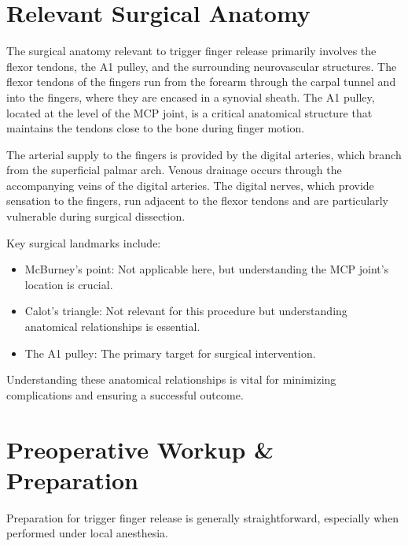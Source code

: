\section*{Relevant Surgical Anatomy}
The surgical anatomy relevant to trigger finger release primarily involves the flexor tendons, the A1 pulley, and the surrounding neurovascular structures. The flexor tendons of the fingers run from the forearm through the carpal tunnel and into the fingers, where they are encased in a synovial sheath. The A1 pulley, located at the level of the MCP joint, is a critical anatomical structure that maintains the tendons close to the bone during finger motion. 

The arterial supply to the fingers is provided by the digital arteries, which branch from the superficial palmar arch. Venous drainage occurs through the accompanying veins of the digital arteries. The digital nerves, which provide sensation to the fingers, run adjacent to the flexor tendons and are particularly vulnerable during surgical dissection. 

Key surgical landmarks include:
\begin{itemize}
  \item McBurney's point: Not applicable here, but understanding the MCP joint's location is crucial.
  \item Calot's triangle: Not relevant for this procedure but understanding anatomical relationships is essential.
  \item The A1 pulley: The primary target for surgical intervention.
\end{itemize}

Understanding these anatomical relationships is vital for minimizing complications and ensuring a successful outcome.

\section*{Preoperative Workup \& Preparation}
Preparation for trigger finger release is generally straightforward, especially when performed under local anesthesia. 

